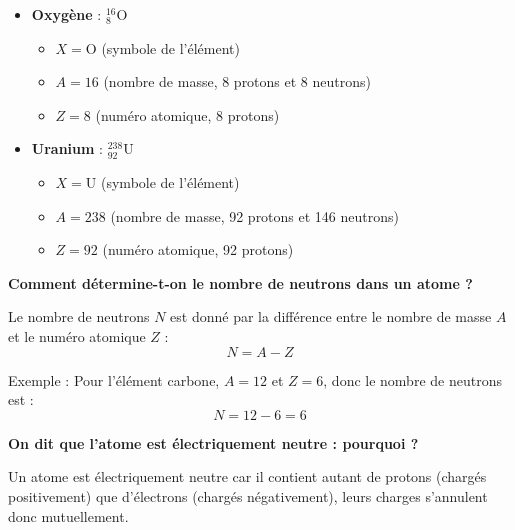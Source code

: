 \documentclass{exam}
\begin{document}
\begin{questions}
\begin{itemize}
    \item \textbf{Oxygène} : $_{8}^{16}\text{O}$
    \begin{itemize}
        \item $X = \text{O}$ (symbole de l'élément)
        \item $A = 16$ (nombre de masse, 8 protons et 8 neutrons)
        \item $Z = 8$ (numéro atomique, 8 protons)
    \end{itemize}

    \item \textbf{Uranium} : $_{92}^{238}\text{U}$
    \begin{itemize}
        \item $X = \text{U}$ (symbole de l'élément)
        \item $A = 238$ (nombre de masse, 92 protons et 146 neutrons)
        \item $Z = 92$ (numéro atomique, 92 protons)
    \end{itemize}
\end{itemize}

  \question[1] \textbf{Comment détermine-t-on le nombre de neutrons dans un atome ?}

  Le nombre de neutrons $N$ est donné par la différence entre le nombre de masse $A$ et le numéro atomique $Z$ :
  \[
  N = A - Z
  \]

  Exemple : Pour l'élément carbone, $A = 12$ et $Z = 6$, donc le nombre de neutrons est :
  \[
  N = 12 - 6 = 6
  \]

  \question[0.5] \textbf{On dit que l'atome est électriquement neutre : pourquoi ?}

  Un atome est électriquement neutre car il contient autant de protons (chargés positivement) que d'électrons (chargés négativement), leurs charges s'annulent donc mutuellement.

\end{questions}
\end{document}
